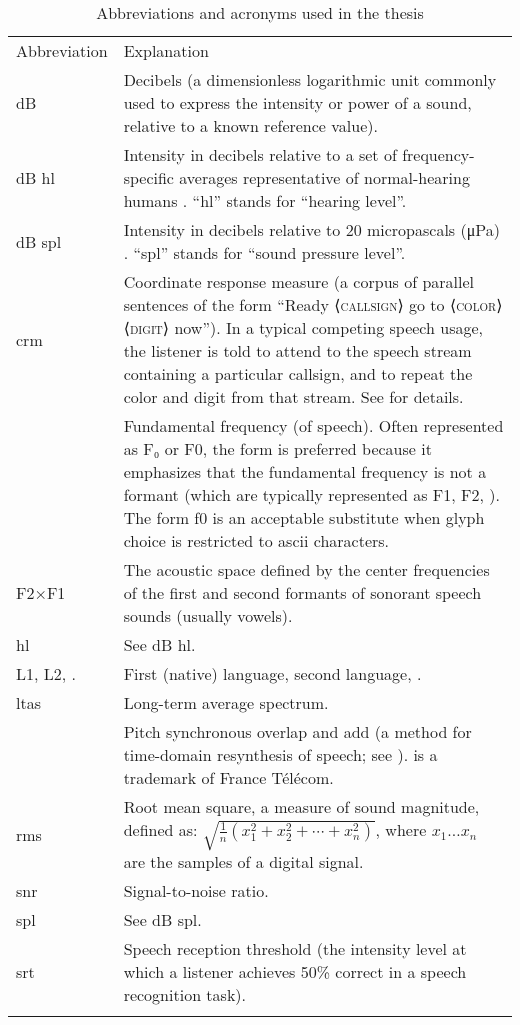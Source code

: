 \begin{table}
	\caption[Abbreviations and acronyms]{Abbreviations and acronyms used in the thesis \label{tab:Abbr}}
	\centering
	\begin{tabu} to \textwidth [c]{X[c m] X[5 m]}
		\toprule
		\everyrow{\midrule}
		\rowfont[c]{\bfseries} Abbreviation & Explanation\\
		{dB} & Decibels (a dimensionless logarithmic unit commonly used to express the intensity or power of a sound, relative to a known reference value).\\ 
		{dB \ac{hl}} & Intensity in decibels relative to a set of frequency-specific averages representative of normal-hearing humans .  “\ac{hl}” stands for “hearing level”.\\
		{dB \ac{spl}} & Intensity in decibels relative to 20 micropascals (μPa) .  “\ac{spl}” stands for “sound pressure level”.\\
		\ac{crm} & Coordinate response measure (a corpus of parallel sentences of the form “Ready ⟨\textsc{callsign}⟩ go to ⟨\textsc{color}⟩ ⟨\textsc{digit}⟩ now”).  In a typical competing speech usage, the listener is told to attend to the speech stream containing a particular callsign, and to repeat the color and digit from that stream.  See \citet{BoliaEtAl2000} for details.\\
		\fo & Fundamental frequency (of speech).  Often represented as F₀ or F0, the form \fo{} is preferred because it emphasizes that the fundamental frequency is not a formant (which are typically represented as F1, F2, \etc).  The form f0 is an acceptable substitute when glyph choice is restricted to \ac{ascii} characters.\\
		F2×F1 & The acoustic space defined by the center frequencies of the first and second formants of sonorant speech sounds (usually vowels).\\
		\ac{hl} & See {dB \ac{hl}}.\\
		L1, L2, \etc. & First (native) language, second language, \etc.\\
		\ac{ltas} & Long-term average spectrum.\\
		\psola & Pitch synchronous overlap and add (a method for time-domain resynthesis of speech; see \citealt{CharpentierMoulines1988, MoulinesCharpentier1990}).  \psola{} is a trademark of France Télécom.\\
		\ac{rms} & Root mean square, a measure of sound magnitude, defined as: \(\sqrt{\frac{1}{n}(x_1^2+x_2^2+\cdots+x_n^2)}\), where \(x_1 \ldots x_n\) are the samples of a digital signal.\\
		\ac{snr} & Signal-to-noise ratio.\\
		\ac{spl} & See {dB \ac{spl}}.\\
		\everyrow{}
		\ac{srt} & Speech reception threshold (the intensity level at which a listener achieves 50\% correct in a speech recognition task).\\
		\bottomrule
	\end{tabu}
\end{table}
